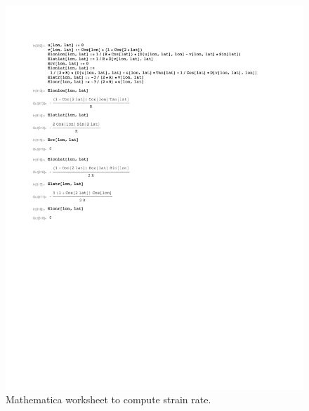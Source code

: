 \documentclass[11pt]{report}
\begin{document}
\begin{figure}[htbp]
 \center
 \includegraphics[scale=0.8, trim = 0 4in 0 0, clip]{f/130520_v_coscos.pdf}
 \caption{Mathematica worksheet to compute strain rate.}
 \label{fig:mathematica2}
\end{figure}
\end{document}
